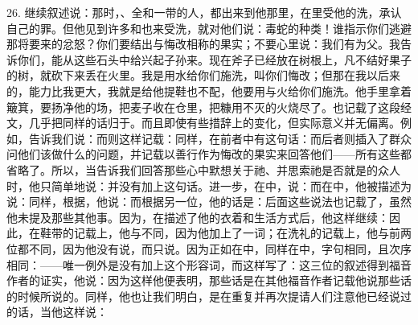 26. 继续叙述说：那时，、全和一带的人，都出来到他那里，在里受他的洗，承认自己的罪。但他见到许多和也来受洗，就对他们说：毒蛇的种类！谁指示你们逃避那将要来的忿怒？你们要结出与悔改相称的果实；不要心里说：我们有为父。我告诉你们，能从这些石头中给兴起子孙来。现在斧子已经放在树根上，凡不结好果子的树，就砍下来丢在火里。我是用水给你们施洗，叫你们悔改；但那在我以后来的，能力比我更大，我就是给他提鞋也不配，他要用与火给你们施洗。他手里拿着簸箕，要扬净他的场，把麦子收在仓里，把糠用不灭的火烧尽了。也记载了这段经文，几乎把同样的话归于。而且即使有些措辞上的变化，但实际意义并无偏离。例如，告诉我们说：而则这样记载：同样，在前者中有这句话：而后者则插入了群众问他们该做什么的问题，并记载以善行作为悔改的果实来回答他们——所有这些都省略了。所以，当告诉我们回答那些心中默想关于祂、并思索祂是否就是的众人时，他只简单地说：并没有加上这句话。进一步，在中，说：而在中，他被描述为说：同样，根据，他说：而根据另一位，他的话是：后面这些说法也记载了，虽然他未提及那些其他事。因为，在描述了他的衣着和生活方式后，他这样继续：因此，在鞋带的记载上，他与不同，因为他加上了一词；在洗礼的记载上，他与前两位都不同，因为他没有说，而只说。因为正如在中，同样在中，字句相同，且次序相同：——唯一例外是没有加上这个形容词，而这样写了：这三位的叙述得到福音作者的证实，他说：因为这样他便表明，那些话是在其他福音作者记载他说那些话的时候所说的。同样，他也让我们明白，是在重复并再次提请人们注意他已经说过的话，当他这样说：\par


